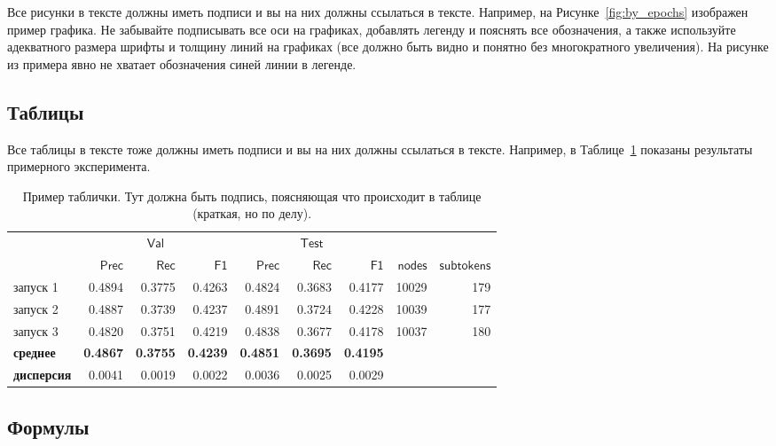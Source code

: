 Все рисунки в тексте должны иметь подписи и вы на них должны ссылаться в тексте. Например, на Рисунке~\ref{fig:by_epochs} изображен пример графика. Не забывайте подписывать все оси на графиках, добавлять легенду и пояснять все обозначения, а также используйте адекватного размера шрифты и толщину линий на графиках (все должно быть видно и понятно без многократного увеличения). На рисунке из примера явно не хватает обозначения синей линии в легенде.


\subsection{Таблицы}

Все таблицы в тексте тоже должны иметь подписи и вы на них должны ссылаться в тексте. Например, в Таблице~\ref{table:long_epochs} показаны результаты примерного эксперимента. 


\begin{table}[ht]
	\caption{Пример таблички. Тут должна быть подпись, поясняющая что происходит в таблице (краткая, но по делу).}
	\label{table:long_epochs}
	\footnotesize
	\centering
	\begin{tabular}{lrrrrrrrr}
		\toprule
		& \multicolumn{3}{c}{$\mathsf{Val}$} &
		\multicolumn{3}{c}{$\mathsf{Test}$} \\
		\cmidrule(lr){2-4} \cmidrule(l){5-7} 
		{} &  $\mathsf{Prec}$ &  $\mathsf{Rec}$ &  $\mathsf{F1}$ &  $\mathsf{Prec}$ &  $\mathsf{Rec}$ &  $\mathsf{F1}$  &  $\mathsf{nodes}$ & $\mathsf{subtokens}$\\
		\midrule
		запуск 1    &    0.4894 &   0.3775 &  0.4263 &     0.4824 &    0.3683 &   0.4177 & 10029 & 179\\
		запуск 2    &    0.4887 &   0.3739 &  0.4237 &     0.4891 &    0.3724 &   0.4228 & 10039 & 177\\
		запуск 3    &    0.4820 &   0.3751 &  0.4219 &     0.4838 &    0.3677 &   0.4178 & 10037&	180\\
		\midrule
		\bf{среднее} &    \bf{0.4867} &   \bf{0.3755} &  \bf{0.4239} &    \bf{ 0.4851} &    \bf{0.3695} &   \bf{0.4195} \\
		\bf{дисперсия}  &    0.0041 &   0.0019 &  0.0022 &     0.0036 &    0.0025 &   0.0029 \\
		\bottomrule
	\end{tabular}
\end{table}

\subsection{Формулы}

